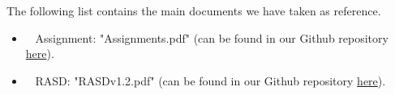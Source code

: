 The following list contains the main documents we have taken as reference.

\begin{itemize}
\item~ Assignment: "Assignments.pdf" (can be found in our Github repository \href{https://github.com/TommasoBianchi/BettiBianchi_SWENG2/blob/master/Assignments.pdf}{here}).
\item~ RASD: "RASDv1.2.pdf" (can be found in our Github repository \href{https://github.com/TommasoBianchi/BettiBianchi_SWENG2/blob/master/Releases}{here}).
\end{itemize}